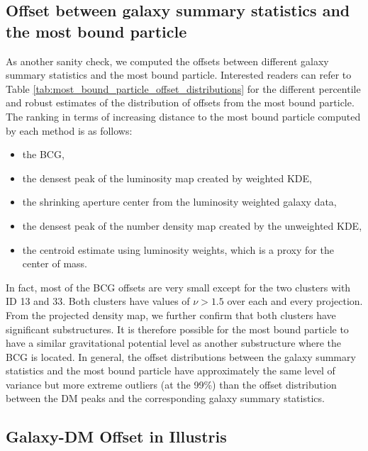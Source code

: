 \subsection{Offset between galaxy summary statistics and the most bound particle}
As another sanity check, we computed the offsets between different galaxy summary
statistics and the most bound particle. 
Interested readers can refer to Table
\ref{tab:most_bound_particle_offset_distributions} for the different
percentile and robust estimates of the distribution of offsets from the most bound 
particle. 
The ranking in terms of increasing distance 
to the most bound particle computed by each method is as follows:
\begin{itemize}
	\item the BCG, 
	\item the densest peak of the luminosity map created by weighted KDE, 
		\item the shrinking aperture center from the luminosity weighted galaxy data,
		\item the densest peak of the number density map created by the unweighted KDE,
		\item the centroid estimate using luminosity weights, which is a proxy for the
			center of mass.
\end{itemize}

In fact, most of the BCG offsets are very small except for the two clusters with ID 13
and 33. Both clusters have  values of $\nu > 1.5 $ over each and every projection. 
From the projected density map, we further confirm that
both clusters have significant substructures. It is therefore possible for the
most bound particle to have a similar gravitational potential level as another 
substructure where the BCG is located. 
In general, the offset distributions between the galaxy summary statistics and
the most bound particle have approximately the same level of variance but more
extreme outliers (at the 99\%) than the
offset distribution between the DM peaks and the corresponding galaxy summary
statistics.

\subsection{Galaxy-DM Offset in Illustris}
\label{subsec:galaxyDMoffset}
